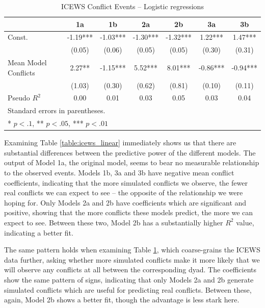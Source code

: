 \begin{table}
\begin{center}
    \caption{ICEWS Conflict Events -- Logistic regressions}
    \label{table:icews_logit}
\begin{tabular}{lcccccc}
    \hline
                    &    1a   &    1b    &    2a    &    2b    &    3a    &    3b     \\
    \hline
    Const.          & -1.19*** & -1.03*** & -1.30*** & -1.32*** & 1.22***  & 1.47***   \\
                    & (0.05)   & (0.06)   & (0.05)   & (0.05)   & (0.30)   & (0.31)    \\
    Mean Model Conflicts & 2.27**   & -1.15*** & 5.52***  & 8.01***  & -0.86*** & -0.94***  \\
                    & (1.03)   & (0.30)   & (0.62)   & (0.81)   & (0.10)   & (0.11)    \\
    \hline
    Pseudo $R^2$      & 0.00     & 0.01     & 0.03     & 0.05     & 0.03     & 0.04      \\
    \hline
    \hline
    \multicolumn{7}{l}{Standard errors in parentheses.} \\
    \multicolumn{7}{l}{* $p<.1$, ** $p<.05$, *** $p<.01$} \\
    \end{tabular}
    \end{center}
\tableSpace
\end{table}

Examining Table \ref{table:icews_linear} immediately shows us that there are substantial differences between the predictive power of the different models. The output of Model 1a, the original model, seems to bear no measurable relationship to the observed events. Models 1b, 3a and 3b have negative mean conflict coefficients, indicating that the more simulated conflicts we observe, the fewer real conflicts we can expect to see -- the opposite of the relationship we were hoping for. Only Models 2a and 2b have coefficients which are significant and positive, showing that the more conflicts these models predict, the more we can expect to see. Between these two, Model 2b has a substantially higher $R^2$ value, indicating a better fit. 

The same pattern holds when examining Table \ref{table:icews_logit}, which coarse-grains the ICEWS data further, asking whether more simulated conflicts make it more likely that we will observe any conflicts at all between the corresponding dyad. The coefficients show the same pattern of signs, indicating that only Models 2a and 2b generate simulated conflicts which are useful for predicting real conflicts. Between these, again, Model 2b shows a better fit, though the advantage is less stark here.

